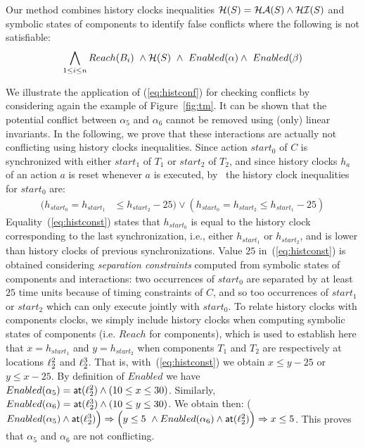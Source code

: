 Our method combines history clocks inequalities $\mathcal{H}(S)=\mathcal{HA}(S)\wedge\mathcal{HI}(S)$ 
and symbolic states of components to identify false conflicts where the following is not
satisfiable:
\begin{equation}\label{eq:histconf}
  \bigwedge_{1 \leq i \leq n} Reach(B_i) \ \wedge \mc{H}(S) \  \wedge \ \enabled{\alpha} 
  \wedge \ \enabled{\beta}
\end{equation}

\begin{example}
We illustrate the application of (\ref{eq:histconf}) for checking conflicts by 
considering again the example of Figure~\ref{fig:tm}.
It can be shown that the potential conflict between $\alpha_5$ and $\alpha_6$ 
cannot be removed using (only) linear invariants.
In the following, we prove that these interactions are actually not conflicting using 
history clocks inequalities.
Since action $start_0$ of $C$ is synchronized with either $start_1$ of $T_1$ or $start_2$ of 
$T_2$, and since history clocks $h_a$ of an action $a$ is reset whenever $a$ is executed, 
by~\cite{hs} the history clock inequalities for $start_0$ are:
\begin{equation}\label{eq:histconst}
\begin{split}
( h_{start_0} = h_{start_1} &\le h_{start_2} - 25 ) \vee 
  ( h_{start_0} = h_{start_2} \le h_{start_1} - 25 )
\end{split}
\end{equation}
Equality~(\ref{eq:histconst}) states that $h_{start_0}$ is equal to the history clock 
corresponding to the last synchronization, i.e., either $h_{start_1}$ or $h_{start_2}$, and is 
lower than history clocks of previous synchronizations. Value $25$ in~(\ref{eq:histconst}) is 
obtained considering \emph{separation constraints} computed from symbolic states of components 
and interactions: two occurrences of $start_0$ are separated by at least $25$ 
time units because of timing constraints of $C$, and so too occurrences of $start_1$ or 
$start_2$ which can only execute jointly with $start_0$.
To relate history clocks with components clocks, we simply include history clocks when 
computing symbolic states of components (i.e. $Reach$ for components), which is used to 
establish here that $x = h_{start_1}$ and $y = h_{start_2}$ when components $T_1$ and $T_2$ 
are respectively at locations $\ell_2^2$ and $\ell_2^3$.
That is, with~(\ref{eq:histconst}) we obtain $x \le y - 25$ or $y \le x - 25$.
  By definition of $Enabled$ we have $Enabled(\alpha_5) = \textsf{at}(\ell_2^2) \wedge 
(10 \leq x \leq 30) $. 
  Similarly, $Enabled(\alpha_6) = \textsf{at}(\ell_2^3) \wedge (10\le y \leq 30)$.
  We obtain then: \Big($Enabled(\alpha_5)\wedge\textsf{at}(\ell_2^3)\Big)\Rightarrow\Big(y\le5 \
  \wedge Enabled(\alpha_6)\wedge\textsf{at}(\ell_2^2)\Big)\Rightarrow x\le5$.
This proves that $\alpha_5$ and $\alpha_6$ are not conflicting. 
\end{example}

